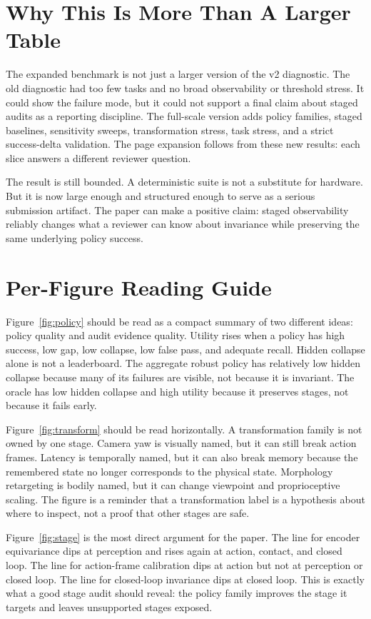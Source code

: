 \documentclass{article}
\begin{document}
\section{Why This Is More Than A Larger Table}

The expanded benchmark is not just a larger version of the v2 diagnostic. The old diagnostic had too few tasks and no broad observability or threshold stress. It could show the failure mode, but it could not support a final claim about staged audits as a reporting discipline. The full-scale version adds policy families, staged baselines, sensitivity sweeps, transformation stress, task stress, and a strict success-delta validation. The page expansion follows from these new results: each slice answers a different reviewer question.

The result is still bounded. A deterministic suite is not a substitute for hardware. But it is now large enough and structured enough to serve as a serious submission artifact. The paper can make a positive claim: staged observability reliably changes what a reviewer can know about invariance while preserving the same underlying policy success.

\section{Per-Figure Reading Guide}

Figure~\ref{fig:policy} should be read as a compact summary of two different ideas: policy quality and audit evidence quality. Utility rises when a policy has high success, low gap, low collapse, low false pass, and adequate recall. Hidden collapse alone is not a leaderboard. The aggregate robust policy has relatively low hidden collapse because many of its failures are visible, not because it is invariant. The oracle has low hidden collapse and high utility because it preserves stages, not because it fails early.

Figure~\ref{fig:transform} should be read horizontally. A transformation family is not owned by one stage. Camera yaw is visually named, but it can still break action frames. Latency is temporally named, but it can also break memory because the remembered state no longer corresponds to the physical state. Morphology retargeting is bodily named, but it can change viewpoint and proprioceptive scaling. The figure is a reminder that a transformation label is a hypothesis about where to inspect, not a proof that other stages are safe.

Figure~\ref{fig:stage} is the most direct argument for the paper. The line for encoder equivariance dips at perception and rises again at action, contact, and closed loop. The line for action-frame calibration dips at action but not at perception or closed loop. The line for closed-loop invariance dips at closed loop. This is exactly what a good stage audit should reveal: the policy family improves the stage it targets and leaves unsupported stages exposed.
\end{document}
